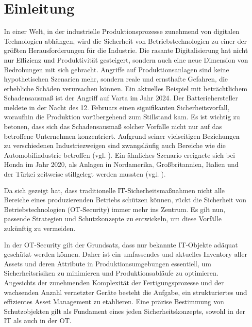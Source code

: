 \section{Einleitung}


In einer Welt, in der industrielle Produktionsprozesse zunehmend von digitalen Technologien abhängen, wird die Sicherheit von Betriebstechnologien zu einer der größten Herausforderungen für die Industrie. Die rasante Digitalisierung hat nicht nur Effizienz und Produktivität gesteigert, sondern auch eine neue Dimension von Bedrohungen mit sich gebracht. Angriffe auf Produktionsanlagen sind keine hypothetischen Szenarien mehr, sondern reale und ernsthafte Gefahren, die erhebliche Schäden verursachen können. Ein aktuelles Beispiel mit beträchtlichem Schadensausmaß ist der Angriff auf Varta im Jahr 2024. Der Batteriehersteller meldete in der Nacht des 12. Februars einen signifikanten Sicherheitsvorfall, woraufhin die Produktion vorübergehend zum Stillstand kam. Es ist wichtig zu betonen, dass sich das Schadensausmaß solcher Vorfälle nicht nur auf das betroffene Unternehmen konzentriert. Aufgrund seiner vielseitigen Beziehungen zu verschiedenen Industriezweigen sind zwangsläufig auch Bereiche wie die Automobilindustrie betroffen (vgl. \cite{VartaAngriff}). Ein ähnliches Szenario ereignete sich bei Honda im Jahr 2020, als Anlagen in Nordamerika, Großbritannien, Italien und der Türkei zeitweise stillgelegt werden mussten (vgl. \cite{HondaAngriff}). 

Da sich gezeigt hat, dass traditionelle IT-Sicherheitsmaßnahmen nicht alle Bereiche eines produzierenden Betriebs schützen können, rückt die Sicherheit von Betriebstechnologien (OT-Security) immer mehr ins Zentrum. Es gilt nun, passende Strategien und Schutzkonzepte zu entwickeln, um diese Vorfälle zukünftig zu vermeiden.

In der OT-Security gilt der Grundsatz, dass nur bekannte IT-Objekte adäquat geschützt werden können. Daher ist ein umfassendes und aktuelles Inventory aller Assets und deren Attribute in Produktionsumgebungen essentiell, um Sicherheitsrisiken zu minimieren und Produktionsabläufe zu optimieren. Angesichts der zunehmenden Komplexität der Fertigungsprozesse und der wachsenden Anzahl vernetzter Geräte besteht die Aufgabe, ein strukturiertes und effizientes Asset Management zu etablieren. Eine präzise Bestimmung von Schutzobjekten gilt als Fundament eines jeden Sicherheitskonzepts, sowohl in der IT als auch in der OT.

